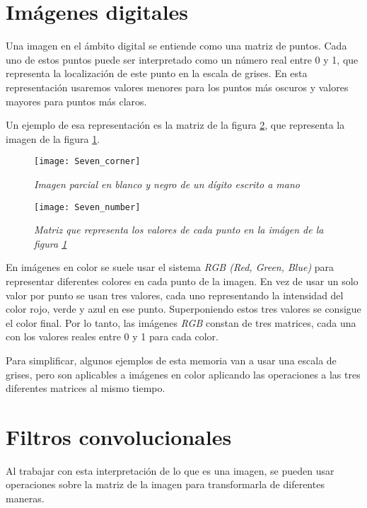 \section{Imágenes digitales}

Una imagen en el ámbito digital se entiende como una matriz de puntos.
Cada uno de estos puntos puede ser interpretado como un número real entre 0 y 1, que representa la localización de este punto en la escala de grises. En esta representación usaremos valores menores para los puntos más oscuros y valores mayores para puntos más claros.

Un ejemplo de esa representación es la matriz de la figura \ref{Seven_number}, que representa la imagen de la figura \ref{Seven_corner}.

\begin{figure}
    \centering
    \caption{\textit{Imagen parcial en blanco y negro de un dígito escrito a mano}}
  \label{Seven_corner}
  \texttt{[image: Seven\_corner]}
\end{figure}

\begin{figure}
    \centering
    \caption{\textit{Matriz que representa los valores de cada punto en la imágen de la figura \ref{Seven_corner}}}
  \label{Seven_number}
  \texttt{[image: Seven\_number]}
\end{figure}


En imágenes en color se suele usar el sistema \textit{RGB (Red, Green, Blue)} para representar diferentes colores en cada punto de la imagen. En vez de usar un solo valor por punto se usan tres valores, cada uno representando la intensidad del color rojo, verde y azul en ese punto. Superponiendo estos tres valores se consigue el color final. Por lo tanto, las imágenes \textit{RGB} constan de tres matrices, cada una con los valores reales entre 0 y 1 para cada color.

Para simplificar, algunos ejemplos de esta memoria van a usar una escala de grises, pero son aplicables a imágenes en color aplicando las operaciones a las tres diferentes matrices al mismo tiempo.

\section{Filtros convolucionales}

Al trabajar con esta interpretación de lo que es una imagen, se pueden usar operaciones sobre la matriz de la imagen para transformarla de diferentes maneras.

